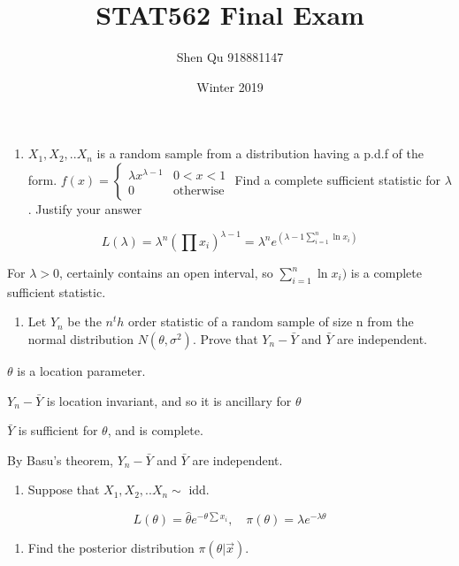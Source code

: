 \documentclass[]{article}
\title{STAT562 Final Exam}
\author{Shen Qu 918881147}
\date{Winter 2019}
\providecommand{\tightlist}{%
  \setlength{\itemsep}{0pt}\setlength{\parskip}{0pt}}
\begin{document}
\maketitle

\begin{enumerate}
\def\labelenumi{\arabic{enumi}.}
\tightlist
\item
  \textcolor[rgb]{0.5,0.5,0.5}{$X_1,X_2,..X_n$ is a random sample from a distribution having a p.d.f of the form.
  $f(x)=\begin{cases}\lambda x^{\lambda-1}&0<x<1\\0&\text{otherwise}\end{cases}$
  Find a complete sufficient statistic for $\lambda$. Justify your answer}
\end{enumerate}

\[L(\lambda)=\lambda^n(\prod x_i)^{\lambda-1}=\lambda^ne^{(\lambda-1\sum^n_{i=1} \ln x_i)}\]

For \(\lambda>0\), certainly contains an open interval, so
\(\sum^n_{i=1} \ln x_i)\) is a complete sufficient statistic.

\begin{enumerate}
\def\labelenumi{\arabic{enumi}.}
\setcounter{enumi}{1}
\tightlist
\item
  \textcolor[rgb]{0.5,0.5,0.5}{Let $Y_n$ be the $n^th$ order statistic of a random sample of size n from the normal distribution $N(\theta,\sigma^2)$. Prove that $Y_n-\bar Y$ and $\bar Y$ are independent.}
\end{enumerate}

\(\theta\) is a location parameter.

\(Y_n-\bar Y\) is location invariant, and so it is ancillary for
\(\theta\)

\(\bar Y\) is sufficient for \(\theta\), and is complete.

By Basu's theorem, \(Y_n-\bar Y\) and \(\bar Y\) are independent.

\begin{enumerate}
\def\labelenumi{\arabic{enumi}.}
\setcounter{enumi}{2}
\tightlist
\item
  \textcolor[rgb]{0.5,0.5,0.5}{Suppose that $X_1,X_2,..X_n\sim$ idd.}
\end{enumerate}

\[L(\theta)=\hat\theta e^{-\theta\sum x_i},\quad \pi(\theta)=\lambda e^{-\lambda\theta}\]

\begin{enumerate}
\def\labelenumi{\alph{enumi}.}
\tightlist
\item
  \textcolor[rgb]{0.5,0.5,0.5}{Find the posterior distribution $\pi(\theta|\vec x)$.}
\end{enumerate}
\end{document}
